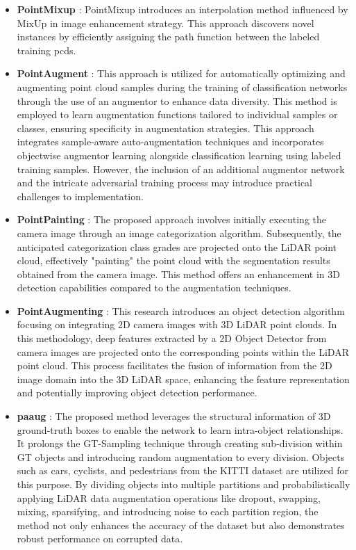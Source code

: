 \begin{itemize}
    \item \textbf{PointMixup} : PointMixup \parencite{pointmixup2020} introduces an interpolation method influenced by MixUp \parencite{mixup} in image enhancement strategy. This approach discovers novel instances by efficiently assigning the path function between the labeled training \acrshort{pcd}s.
    \item \textbf{PointAugment} : This approach \parencite{pointaugment2020}is utilized for automatically optimizing and augmenting point cloud samples during the training of classification networks through the use of an augmentor to enhance data diversity. This method is employed to learn augmentation functions tailored to individual samples or classes, ensuring specificity in augmentation strategies. This approach integrates sample-aware auto-augmentation techniques and incorporates objectwise augmentor learning alongside classification learning using labeled training samples. However, the inclusion of an additional augmentor network and the intricate adversarial training process may introduce practical challenges to implementation.
    \item \textbf{PointPainting} : The proposed approach \parencite{pointpainting2019} involves initially executing the camera image through an image categorization algorithm. Subsequently, the anticipated categorization class grades are projected onto the LiDAR point cloud, effectively "painting" the point cloud with the segmentation results obtained from the camera image. This method offers an enhancement in 3D detection capabilities compared to the augmentation techniques.
    \item \textbf{PointAugmenting} : This research \parencite{pointaugmenting2021} introduces an object detection algorithm focusing on integrating 2D camera images with 3D LiDAR point clouds. In this methodology, deep features extracted by a 2D Object Detector from camera images are projected onto the corresponding points within the LiDAR point cloud. This process facilitates the fusion of information from the 2D image domain into the 3D LiDAR space, enhancing the feature representation and potentially improving object detection performance.
    \item \textbf{\acrfull{paaug}} : The proposed method \parencite{pa_aug2020} leverages the structural information of 3D ground-truth boxes to enable the network to learn intra-object relationships. It prolongs the GT-Sampling technique through creating sub-division within GT objects and introducing random augmentation to every division. Objects such as cars, cyclists, and pedestrians from the KITTI dataset are utilized for this purpose. By dividing objects into multiple partitions and probabilistically applying LiDAR data augmentation operations like dropout, swapping, mixing, sparsifying, and introducing noise to each partition region, the method not only enhances the accuracy of the dataset but also demonstrates robust performance on corrupted data.

\end{itemize}
